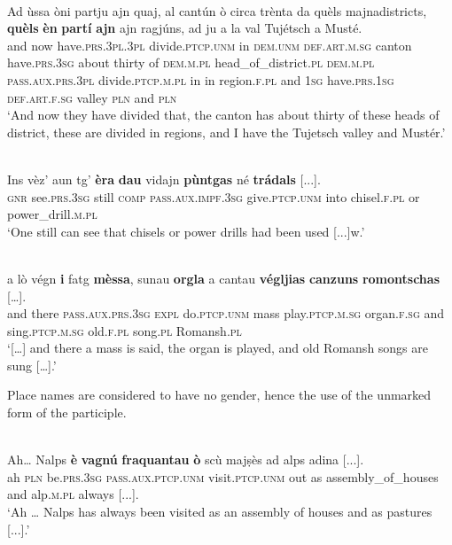 \ea\label{}
\\
\gll Ad ùssa òni partju ajn quaj, al cantún ò circa trènta da quèls majnadistricts, \textbf{quèls} \textbf{èn} \textbf{partí} \textbf{ajn} ajn ragjúns, ad ju a la val Tujétsch a Musté.\\
and now have.\textsc{prs.3pl.3pl} divide.\textsc{ptcp.unm} in \textsc{dem.unm} \textsc{def.art.m.sg} canton  have.\textsc{prs.3sg} about thirty of \textsc{dem.m.pl} head\_of\_district.\textsc{pl} \textsc{dem.m.pl} \textsc{pass.aux.prs.3pl} divide.\textsc{ptcp.m.pl} in in region.\textsc{f.pl} and \textsc{1sg} have.\textsc{prs.1sg} \textsc{def.art.f.sg} valley \textsc{pln} and \textsc{pln}\\
\glt `And now they have divided that, the canton has about thirty of these heads of district, these are divided in regions, and I have the Tujetsch valley and Mustér.'
\z

\ea\label{}
\\
\gll Ins vèz’ aun tg’ \textbf{èra} \textbf{dau} vidajn \textbf{pùntgas} né \textbf{trádals} [...].   \\
\textsc{gnr} see.\textsc{prs.3sg} still \textsc{comp} \textsc{pass.aux.impf.3sg} give.\textsc{ptcp.unm} into chisel.\textsc{f.pl} or power\_drill.\textsc{m.pl}\\
\glt `One still can see that chisels or power drills had been used [...]w.'
\z

\ea\label{ex:1:}
 {\citealt[94]{Büchli1966}}\\
\gll    [...] a lò végn \textbf{i} fatg \textbf{mèssa}, sunau \textbf{orgla} a cantau \textbf{végljias} \textbf{canzuns} \textbf{romontschas} […].\\
 {}    and there \textsc{pass.aux.prs.3sg}  \textsc{expl} do.\textsc{ptcp.unm} mass play.\textsc{ptcp.m.sg} organ.\textsc{f.sg}  and sing.\textsc{ptcp.m.sg} old.\textsc{f.pl} song.\textsc{pl} Romansh.\textsc{pl}\\
\glt `[…] and there a mass is said, the organ is played, and old Romansh songs are sung […].'
\z

Place names are considered to have no gender, hence the use of the unmarked form of the participle.

\ea\label{}
\\
\gll Ah… Nalps \textbf{è} \textbf{vagnú} \textbf{fraquantau} \textbf{ò} scù majṣès ad alps adina [...].\\
ah  \textsc{pln}  be.\textsc{prs.3sg} \textsc{pass.aux.ptcp.unm} visit.\textsc{ptcp.unm} out as assembly\_of\_houses and alp.\textsc{m.pl} always [...].\\
\glt `Ah … Nalps has always been visited as an assembly of houses and as pastures [...].'
\z

